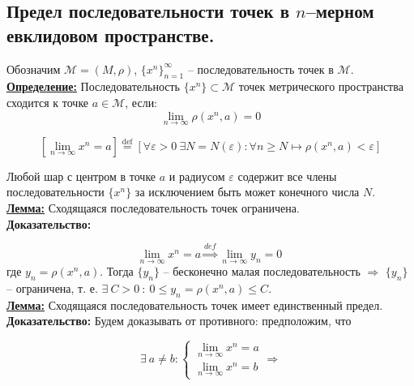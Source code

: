 \documentclass[a4paper,12pt]{article} %
\newcommand{\eqdef}{\stackrel{\mathrm{def}}{=}}
\begin{document}
\subsection{Предел последовательности точек в $n$–мерном евклидовом пространстве.}

Обозначим $\mathscr{M} = (M, \rho)$, $\{x^n \}_{n = 1}^{\infty}$ -- последовательность точек в $\mathscr{M}$.\\

\underline{\textbf{Определение:}} Последовательность $\{x^n \} \subset \mathscr{M}$ точек метрического пространства сходится к точке $a \in \mathscr{M}$, если:
\begin{equation*}
    \lim\limits_{n \to \infty} \rho(x^n, a) = 0
\end{equation*}

\[ [\lim\limits_{n \to \infty} x^n = a] \eqdef [\forall \varepsilon > 0 ~ \exists N = N(\varepsilon) : \forall n \geqslant N \mapsto \rho(x^n, a) < \varepsilon] \]

\noindent Любой шар с центром в точке $a$ и радиусом $\varepsilon$ содержит все члены последовательности $\{x^n \}$ за исключением быть может конечного числа $N$.\\

\underline{\textbf{Лемма:}} Сходящаяся последовательность точек ограничена.\\

\textbf{Доказательство:}

\[ \lim\limits_{n \to \infty} x^n = a \stackrel{def}{\Rightarrow} \lim\limits_{n \to \infty} y_n = 0 \
\]
\noindent где $y_n = \rho(x^n, a)$. Тогда $\{y_n \}$ -- бесконечно малая последовательность $\Rightarrow$ $\{y_n \}$ -- ограничена, т. е. $\exists ~ C > 0 ~ : ~ 0 \leqslant y_n = \rho(x^n, a) \leqslant C$.\\

\underline{\textbf{Лемма:}} Сходящаяся последовательность точек имеет единственный предел.\\

\textbf{Доказательство:} Будем доказывать от противного: предположим, что

\begin{equation*}
    \exists ~ a \neq b : 
    \begin{cases}
        \lim\limits_{n \to \infty} x^n = a\\
        \lim\limits_{n \to \infty} x^n = b
    \end{cases}
    \Rightarrow
\end{equation*}
\end{document}

